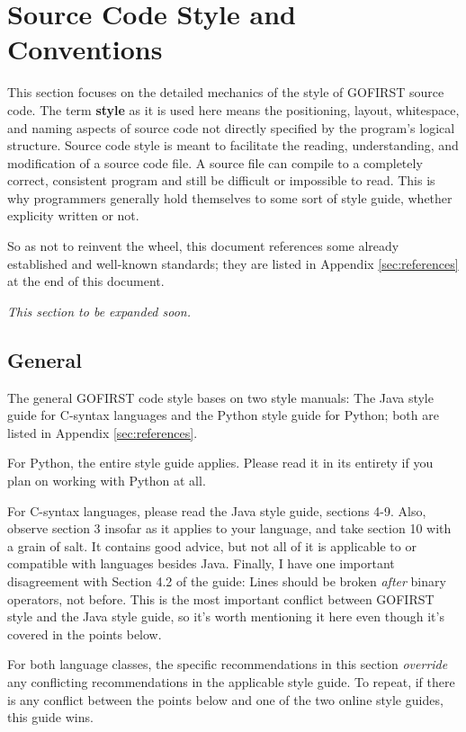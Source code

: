 \documentclass[12pt]{article}
\newcommand{\textdef}[1]{\textbf{#1}}
\begin{document}
\section{Source Code Style and Conventions}
\label{sec:codestyle}
This section focuses on the detailed mechanics of the style of GOFIRST source code. The term \textdef{style} as it is used here means the positioning, layout, whitespace, and naming aspects of source code not directly specified by the program's logical structure. Source code style is meant to facilitate the reading, understanding, and modification of a source code file. A source file can compile to a completely correct, consistent program and still be difficult or impossible to read. This is why programmers generally hold themselves to some sort of style guide, whether explicity written or not.

So as not to reinvent the wheel, this document references some already established and well-known standards; they are listed in Appendix \ref{sec:references} at the end of this document.

\textit{This section to be expanded soon.}

\subsection{General}
The general GOFIRST code style bases on two style manuals: The Java style guide for C-syntax languages and the Python style guide for Python; both are listed in Appendix \ref{sec:references}.

For Python, the entire style guide applies. Please read it in its entirety if you plan on working with Python at all.

For C-syntax languages, please read the Java style guide, sections 4-9. Also, observe section 3 insofar as it applies to your language, and take section 10 with a grain of salt. It contains good advice, but not all of it is applicable to or compatible with languages besides Java. Finally, I have one important disagreement with Section 4.2 of the guide: Lines should be broken \emph{after} binary operators, not before. This is the most important conflict between GOFIRST style and the Java style guide, so it's worth mentioning it here even though it's covered in the points below.

For both language classes, the specific recommendations in this section \emph{override} any conflicting recommendations in the applicable style guide. To repeat, if there is any conflict between the points below and one of the two online style guides, this guide wins.
\end{document}
